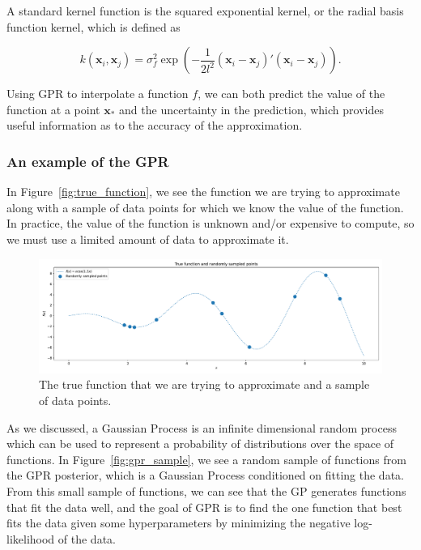 \documentclass[\econtexRoot/SequentialEGM]{subfiles}
\begin{document}
A standard kernel function is the squared exponential kernel, or the radial basis function kernel, which is defined as

\begin{equation}
  k(\mathbf{x}_i, \mathbf{x}_j) = \sigma^2_f \exp\left(-\frac{1}{2l^2} (\mathbf{x}_i - \mathbf{x}_j)' (\mathbf{x}_i - \mathbf{x}_j)\right).
\end{equation}

Using GPR to interpolate a function $f$, we can both predict the value of the function at a point $\mathbf{x}_*$ and the uncertainty in the prediction, which provides useful information as to the accuracy of the approximation.

\subsubsection{An example of the GPR}

In Figure~\ref{fig:true_function}, we see the function we are trying to approximate along with a sample of data points for which we know the value of the function. In practice, the value of the function is unknown and/or expensive to compute, so we must use a limited amount of data to approximate it.

\begin{figure}
  \centering
  \includegraphics[width=\linewidth]{Figures/true_function.pdf}
  \caption{The true function that we are trying to approximate and a sample of data points.}
  \notinsubfile{\label{fig:true_function}}
\end{figure}

As we discussed, a Gaussian Process is an infinite dimensional random process which can be used to represent a probability of distributions over the space of functions. In Figure~\ref{fig:gpr_sample}, we see a random sample of functions from the GPR posterior, which is a Gaussian Process conditioned on fitting the data. From this small sample of functions, we can see that the GP generates functions that fit the data well, and the goal of GPR is to find the one function that best fits the data given some hyperparameters by minimizing the negative log-likelihood of the data.
\end{document}
